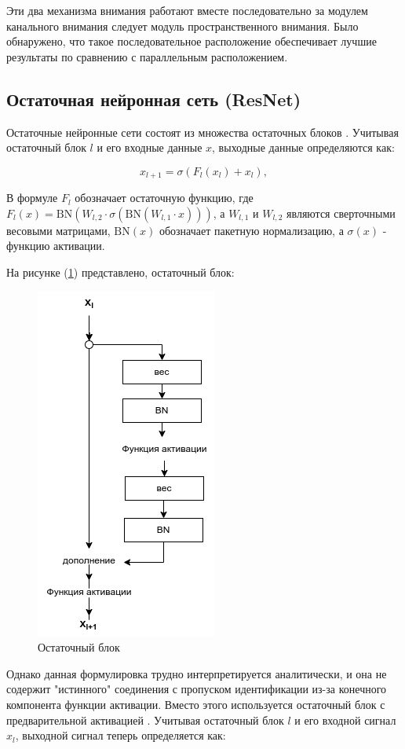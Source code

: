 Эти два механизма внимания работают вместе последовательно за модулем канального внимания следует модуль пространственного внимания. Было обнаружено, что такое последовательное расположение обеспечивает лучшие результаты по сравнению с параллельным расположением.

\subsection{Остаточная нейронная сеть (ResNet)}

Остаточные нейронные сети состоят из множества остаточных блоков \cite{he2016deep}. Учитывая остаточный блок \(l\) и его входные данные \(x\), выходные данные определяются как:

\begin{equation}
    x_{l + 1} = \sigma(F_{l}(x_{l}) + x_{l})
, \end{equation}

В формуле \(F_{l}\) обозначает остаточную функцию, где \(F_{l}(x) = \text{BN}(W_{l,2} \cdot \sigma(\text{BN}(W_{l,1} \cdot x)))\), а \(W_{l,1}\) и \(W_{l,2}\) являются сверточными весовыми матрицами, \(\text{BN}(x)\) обозначает пакетную нормализацию, а \(\sigma(x)\) - функцию активации.

На рисунке (\ref{fig:residual-block}) представлено, остаточный блок: 
\begin{figure}[H]
	\centering
	\includegraphics[width=0.3\linewidth]{assets/residual-block.png}
	\caption{Остаточный блок}
	\label{fig:residual-block}
\end{figure}

Однако данная формулировка трудно интерпретируется аналитически, и она не содержит "истинного" соединения с пропуском идентификации из-за конечного компонента функции активации. Вместо этого используется остаточный блок с предварительной активацией \cite{he2016identity}. Учитывая остаточный блок \(l\) и его входной сигнал \(x_{l}\), выходной сигнал теперь определяется как:

